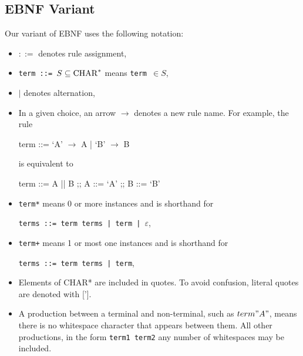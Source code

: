\subsection{EBNF Variant}
Our variant of EBNF uses the following notation:
\begin{itemize}
  \item $::=$ denotes rule assignment,
  \item \texttt{term ::= $S \subseteq \mathrm{CHAR}^{*}$} means \texttt{term $\in S$},
  \item $|$ denotes alternation,
	\item In a given choice, an arrow $\to$ denotes a new rule name. For example, the rule
		\begin{bnfgrammar}
			term ::= `A' $\to$ A | `B' $\to$ B
		\end{bnfgrammar}
		is equivalent to
		\begin{bnfgrammar}
			term ::= A || B ;;
			A ::= `A' ;;
			B ::= `B'
		\end{bnfgrammar}
	\item \texttt{term*} means 0 or more instances and is shorthand for
	\begin{center}
		\texttt{terms ::= term terms | term | $\varepsilon$},
	\end{center}
	\item \texttt{term+} means 1 or most one instances and is shorthand for
	\begin{center}
		\texttt{terms ::= term terms | term},
	\end{center}
  \item Elements of CHAR* are included in quotes. To avoid confusion, literal quotes are denoted with ['].
	\item A production between a terminal and non-terminal, such as $term"A"$, means there is no whitespace character that appears between them. All other productions, in the form \texttt{term1 term2} any number of whitespaces may be included.
\end{itemize}

